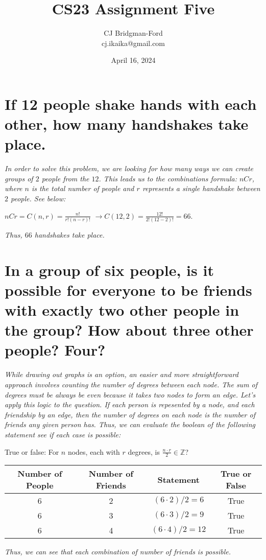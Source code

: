 \documentclass{article}
\title{CS23 Assignment Five}
\author{CJ Bridgman-Ford \\ cj.ikaika@gmail.com}
\date{April 16, 2024}
\begin{document}
\maketitle
\thispagestyle{empty}

\clearpage

\section{If 12 people shake hands with each other, how many
    handshakes take place.}
\hspace{1cm}\textit{In order to solve this problem, we are
    looking for how many ways we can create groups of $2$
    people from the $12$. This leads us to the combinations
    formula: $nCr$, where $n$ is the total number of people
    and $r$ represents a single handshake between $2$ people.
    See below:}
\begin{center}
    \large{$nCr = C(n,r) = \frac{n!}{r!(n-r)!}$}
    \large{$\xrightarrow{} C(12,2) = \frac{12!}{2!(12-2)!}
        = 66$.} \\
\end{center}
\hspace{1cm}\textit{Thus, $66$ handshakes take place.}

\section{In a group of six people, is it possible for everyone
    to be friends with exactly two other people in the group?
    How about three other people? Four?}
\hspace{1cm}\textit{While drawing out graphs is an option, an
    easier and more straightforward approach involves counting
    the number of degrees between each node. The sum of degrees
    must be always be even because it takes two nodes to form
    an edge. Let's apply this logic to the question. If each person
    is repesented by a node, and each friendship by an edge, then the
    number of degrees on each node is the number of friends any given
    person has. Thus, we can evaluate the boolean of the following
    statement see if each case is possible:}
\begin{center}
    \large{True or false: For $n$ nodes, each with $r$ degrees, is 
    $\frac{n\cdot r}{2} \in \mathbb{Z}$?} \\
    \vspace{0.25cm}
    \normalsize{}
    \begin{tabular}{|c|c|c|c|}
        \hline
        Number of People & Number of Friends & Statement & True or False \\
        \hline
        6 & 2 & $(6\cdot 2)/2 = 6$ & True \\
        6 & 3 & $(6\cdot 3)/2 = 9$ & True \\
        6 & 4 & $(6\cdot 4)/2 = 12$ & True \\
        \hline
    \end{tabular}
\end{center}
\hspace{1cm}\textit{Thus, we can see that each combination of number
    of friends is possible.}
\end{document}
